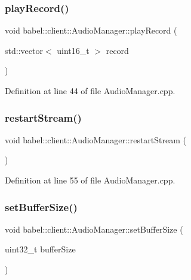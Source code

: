 \subsubsection{\texorpdfstring{play\+Record()}{playRecord()}}
{\footnotesize\ttfamily void babel\+::client\+::\+Audio\+Manager\+::play\+Record (\begin{DoxyParamCaption}\item[{std\+::vector$<$ uint16\+\_\+t $>$}]{record }\end{DoxyParamCaption})}



Definition at line 44 of file Audio\+Manager.\+cpp.

\mbox{\label{classbabel_1_1client_1_1_audio_manager_a478deea7a48b2d3a51feb5ef01e005d6}} 
\subsubsection{\texorpdfstring{restart\+Stream()}{restartStream()}}
{\footnotesize\ttfamily void babel\+::client\+::\+Audio\+Manager\+::restart\+Stream (\begin{DoxyParamCaption}{ }\end{DoxyParamCaption})}



Definition at line 55 of file Audio\+Manager.\+cpp.

\mbox{\label{classbabel_1_1client_1_1_audio_manager_af04bbbdc6fe71b81ae32fa3f133a1639}} 
\subsubsection{\texorpdfstring{set\+Buffer\+Size()}{setBufferSize()}}
{\footnotesize\ttfamily void babel\+::client\+::\+Audio\+Manager\+::set\+Buffer\+Size (\begin{DoxyParamCaption}\item[{uint32\+\_\+t}]{buffer\+Size }\end{DoxyParamCaption})}



